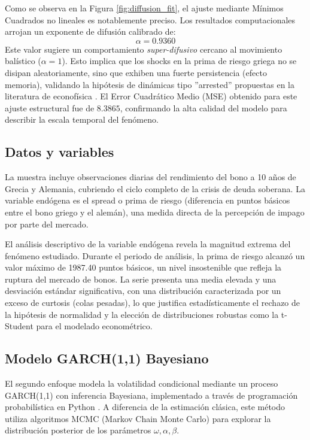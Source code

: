 Como se observa en la Figura \ref{fig:diffusion_fit}, el ajuste mediante Mínimos Cuadrados no lineales es notablemente preciso. Los resultados computacionales arrojan un exponente de difusión calibrado de:
\[
\alpha = 0.9360
\]
Este valor sugiere un comportamiento \textit{super-difusivo} cercano al movimiento balístico ($\alpha=1$). Esto implica que los shocks en la prima de riesgo griega no se disipan aleatoriamente, sino que exhiben una fuerte persistencia (efecto memoria), validando la hipótesis de dinámicas tipo ''arrested'' propuestas en la literatura de econofísica \cite{Alvarez2002}. El Error Cuadrático Medio (MSE) obtenido para este ajuste estructural fue de $\mathbf{8.3865}$, confirmando la alta calidad del modelo para describir la escala temporal del fenómeno.

\subsection{Datos y variables}
La muestra incluye observaciones diarias del rendimiento del bono a 10 años de Grecia y Alemania, cubriendo el ciclo completo de la crisis de deuda soberana. La variable endógena es el spread o prima de riesgo (diferencia en puntos básicos entre el bono griego y el alemán), una medida directa de la percepción de impago por parte del mercado.

El análisis descriptivo de la variable endógena revela la magnitud extrema del fenómeno estudiado. Durante el periodo de análisis, la prima de riesgo alcanzó un valor máximo de 1987.40 puntos básicos, un nivel insostenible que refleja la ruptura del mercado de bonos. La serie presenta una media elevada y una desviación estándar significativa, con una distribución caracterizada por un exceso de curtosis (colas pesadas), lo que justifica estadísticamente el rechazo de la hipótesis de normalidad y la elección de distribuciones robustas como la t-Student para el modelado econométrico.

\subsection{Modelo GARCH(1,1) Bayesiano}

El segundo enfoque modela la volatilidad condicional mediante un proceso GARCH(1,1) con inferencia Bayesiana, implementado a través de programación probabilística en Python \cite{Salvatier2016}. A diferencia de la estimación clásica, este método utiliza algoritmos MCMC (Markov Chain Monte Carlo) para explorar la distribución posterior de los parámetros $\omega, \alpha, \beta$.

